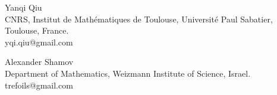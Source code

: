 \documentclass[12pt]{paper}
\numberwithin{theorem}{section}
\numberwithin{figure}{section}
\numberwithin{equation}{section}
\begin{document}
\bigbreak
\noindent Yanqi Qiu \\
\noindent
 CNRS, Institut de Math{\'e}matiques de Toulouse, Universit{\'e} Paul Sabatier, Toulouse, France.\\
\noindent yqi.qiu@gmail.com


\bigbreak
\noindent Alexander Shamov \\
\noindent
Department of Mathematics, Weizmann Institute of Science, Israel.\\
\noindent trefoils@gmail.com
\end{document}
